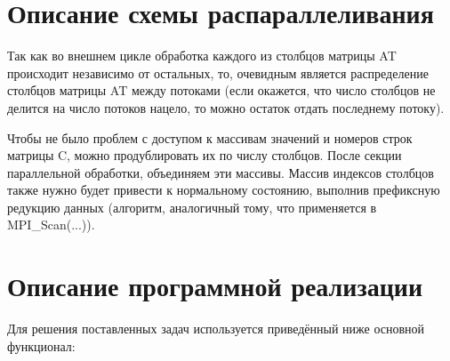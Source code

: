 \documentclass{report}
\begin{document}
	\section*{Описание схемы распараллеливания}
		\par Так как во внешнем цикле обработка каждого из столбцов матрицы AT происходит независимо от остальных, то, очевидным является распределение столбцов матрицы AT между потоками (если окажется, что число столбцов не делится на число потоков нацело, то можно остаток отдать последнему потоку).
		\par Чтобы не было проблем с доступом к массивам значений и номеров строк матрицы C, можно продублировать их по числу столбцов. После секции параллельной обработки, объединяем эти массивы. Массив индексов столбцов также нужно будет привести к нормальному состоянию, выполнив префиксную редукцию данных (алгоритм, аналогичный тому, что применяется в MPI\_Scan(...)).
	\newpage


	\section*{Описание программной реализации}
		\par Для решения поставленных задач используется приведённый ниже основной функционал:
\end{document}
